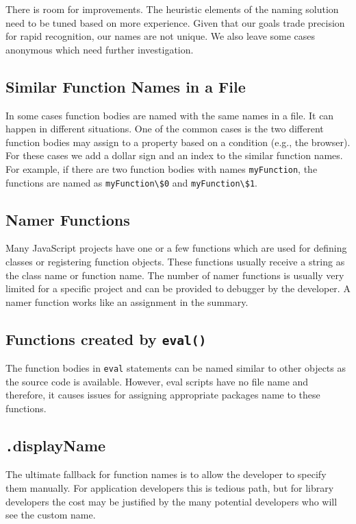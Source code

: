 \documentclass[10pt, preprint]{sigplanconf}
\begin{document}
There is room for improvements. The heuristic elements of the naming solution need to be tuned based on more experience.  Given that our goals trade precision for rapid recognition, our names are not unique. We also leave some cases anonymous which need further investigation. 


\subsection{Similar Function Names in a File}
In some cases function bodies are named with the same names in a file. It can happen in different situations. One of the common cases is the two different function bodies may assign to a property based on a condition (e.g., the browser). For these cases we add a dollar sign and an index to the similar function names. For example, if there are two function bodies with names \verb|myFunction|, the functions are named as \verb|myFunction\$0| and \verb|myFunction\$1|. 

\subsection{Namer Functions}
Many JavaScript projects have one or a few functions which are used for defining classes or registering function objects. These functions usually receive a string as the class name or function name. The number of namer functions is usually very limited for a specific project and can be provided to debugger by the developer. A namer function works like an assignment in the summary.  



\subsection{Functions created by {\large \texttt{eval()}}}
The function bodies in \verb|eval| statements can be named similar to other objects as the source code is available. However, eval scripts have no file name and therefore, it causes issues for assigning appropriate packages name to these functions. 

\subsection{ {\texttt .displayName} }
The ultimate fallback for function names is to allow the developer to specify them manually. For application developers this is tedious path, but for library developers the cost may be justified by the many potential developers who will see the custom name.
\end{document}
